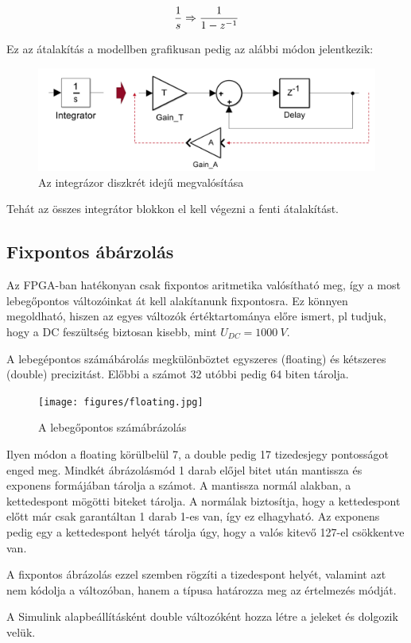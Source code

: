 \begin{equation}
\centering
\frac{1}{s} \Rightarrow \frac{1}{1-z^{-1}}
\end{equation}

Ez az átalakítás a modellben grafikusan pedig az alábbi módon jelentkezik:

\begin{figure}[H!]
	\centering
	\includegraphics[width = \textwidth]{figures/integrator.png}
	\caption{Az integrázor diszkrét idejű megvalósítása} 
	\label{fig:integrator}
\end{figure}

Tehát az összes integrátor blokkon el kell végezni a fenti átalakítást.


\subsection{Fixpontos ábárzolás}

Az FPGA-ban hatékonyan csak fixpontos aritmetika valósítható meg, így a most lebegőpontos változóinkat át kell alakítanunk fixpontosra. Ez könnyen megoldható, hiszen az egyes változók értéktartománya előre ismert, pl tudjuk, hogy a DC feszültség biztosan kisebb, mint $U_{DC}=1000\ V$.

A lebegépontos számábárolás megkülönböztet egyszeres (floating) és kétszeres (double) precizitást. Előbbi a számot 32 utóbbi pedig 64 biten tárolja.

\begin{figure}[H!]
	\centering
	\texttt{[image: figures/floating.jpg]}
	\caption{A lebegőpontos számábrázolás} 
	\label{fig:floating}
\end{figure}

Ilyen módon a floating körülbelül 7, a double pedig 17 tizedesjegy pontosságot enged meg. Mindkét ábrázolásmód 1 darab előjel bitet után mantissza és exponens formájában tárolja a számot. A mantissza normál alakban, a kettedespont mögötti biteket tárolja. A normálak biztosítja, hogy a kettedespont előtt már csak garantáltan 1 darab 1-es van, így ez elhagyható. Az exponens pedig egy a kettedespont helyét tárolja úgy, hogy a valós kitevő 127-el csökkentve van.

A fixpontos ábrázolás ezzel szemben rögzíti a tizedespont helyét, valamint azt nem kódolja a változóban, hanem a típusa határozza meg az értelmezés módját.


A Simulink alapbeállításként double változóként hozza létre a jeleket és dolgozik velük. 